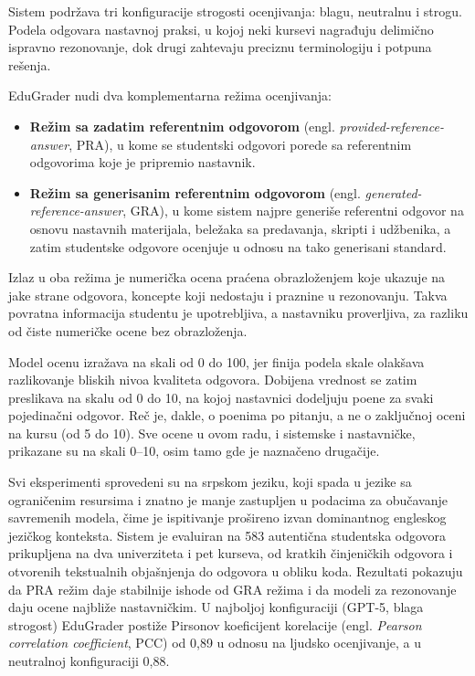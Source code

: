 Sistem podržava tri konfiguracije strogosti ocenjivanja: blagu, neutralnu i strogu.
Podela odgovara nastavnoj praksi, u kojoj neki kursevi nagrađuju delimično ispravno rezonovanje,
dok drugi zahtevaju preciznu terminologiju i potpuna rešenja.

EduGrader nudi dva komplementarna režima ocenjivanja:
\begin{itemize}
    \item \textbf{Režim sa zadatim referentnim odgovorom} (engl. \emph{provided-reference-answer}, PRA),
    u kome se studentski odgovori porede sa referentnim odgovorima koje je pripremio nastavnik.
    \item {\sloppy \textbf{Režim sa generisanim referentnim odgovorom} (engl. \emph{generated-reference-answer}, GRA),
    u kome sistem najpre generiše referentni odgovor na osnovu nastavnih materijala,
    beležaka sa predavanja, skripti i udžbenika,
    a zatim studentske odgovore ocenjuje u odnosu na tako generisani standard.\par}
\end{itemize}

Izlaz u oba režima je numerička ocena praćena obrazloženjem koje ukazuje na jake strane odgovora, koncepte koji nedostaju i praznine u rezonovanju.
Takva povratna informacija studentu je upotrebljiva, a nastavniku proverljiva, za razliku od čiste numeričke ocene bez obrazloženja.

Model ocenu izražava na skali od 0 do 100, jer finija podela skale olakšava razlikovanje bliskih nivoa kvaliteta odgovora.
Dobijena vrednost se zatim preslikava na skalu od 0 do 10, na kojoj nastavnici dodeljuju poene za svaki pojedinačni odgovor.
Reč je, dakle, o poenima po pitanju, a ne o zaključnoj oceni na kursu (od 5 do 10).
Sve ocene u ovom radu, i sistemske i nastavničke, prikazane su na skali 0--10, osim tamo gde je naznačeno drugačije.

Svi eksperimenti sprovedeni su na srpskom jeziku,
koji spada u jezike sa ograničenim resursima i znatno je manje zastupljen u podacima za obučavanje savremenih modela,
čime je ispitivanje prošireno izvan dominantnog engleskog jezičkog konteksta.
Sistem je evaluiran na 583 autentična studentska odgovora prikupljena na dva univerziteta i pet kurseva,
od kratkih činjeničkih odgovora i otvorenih tekstualnih objašnjenja do odgovora u obliku koda.
Rezultati pokazuju da PRA režim daje stabilnije ishode od GRA režima i da modeli za rezonovanje daju ocene najbliže nastavničkim.
U najboljoj konfiguraciji (GPT-5, blaga strogost) EduGrader postiže Pirsonov koeficijent korelacije (engl.
\emph{Pearson correlation coefficient}, PCC) od 0{,}89 u odnosu na ljudsko ocenjivanje, a u neutralnoj konfiguraciji 0{,}88.

